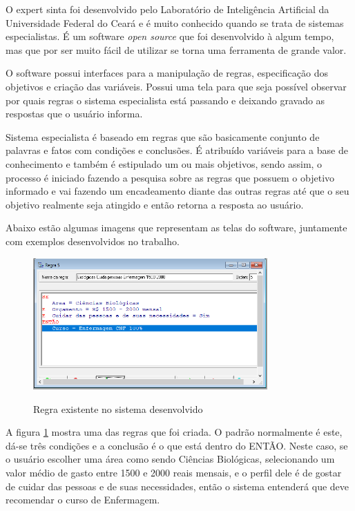 O expert sinta foi desenvolvido pelo  Laboratório de Inteligência Artificial da Universidade Federal do Ceará e é muito conhecido quando se trata de sistemas especialistas. É um software \textit{open source} que foi desenvolvido à algum tempo, mas que por ser muito fácil de utilizar se torna uma ferramenta de grande valor. \cite{Jones}

O software possui interfaces para a manipulação de regras, especificação dos objetivos e criação das variáveis. Possui uma tela para que seja possível observar por quais regras o sistema especialista está passando e deixando gravado as respostas que o usuário informa.

Sistema especialista é baseado em regras que são basicamente conjunto de palavras e fatos com condições e conclusões. É atribuído variáveis para a base de conhecimento e também é estipulado um ou mais objetivos, sendo assim, o processo é iniciado fazendo a pesquisa sobre as regras que possuem o objetivo informado e vai fazendo um encadeamento diante das outras regras até que o seu objetivo realmente seja atingido e então retorna a resposta ao usuário.

Abaixo estão algumas imagens que representam as telas do software, juntamente com exemplos desenvolvidos no trabalho.



\begin{figure}[H]
    \centering
    \caption{Regra existente no sistema desenvolvido}
    \includegraphics[width=0.8\textwidth]{regras.PNG}
    \label{regras}
\end{figure}
A figura \ref{regras} mostra uma das regras que foi criada. O padrão normalmente é este, dá-se três condições e a conclusão é o que está dentro do ENTÃO. Neste caso, se o usuário escolher uma área como sendo Ciências Biológicas, selecionando um valor médio de gasto entre 1500 e 2000 reais mensais, e o perfil dele é de gostar de cuidar das pessoas e de suas necessidades, então o sistema entenderá que deve recomendar o curso de Enfermagem.
 
